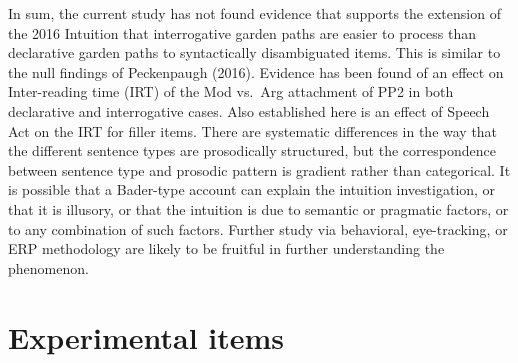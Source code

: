 \documentclass[12pt,oneside]{book}
\begin{document}
In sum, the current study has not found evidence that supports the extension of the 2016 Intuition that interrogative garden paths are easier to process than declarative garden paths to syntactically disambiguated items. This is similar to the null findings of Peckenpaugh (2016). Evidence has been found of an effect on Inter-reading time (IRT) of the Mod vs.~Arg attachment of PP2 in both declarative and interrogative cases. Also established here is an effect of Speech Act on the IRT for filler items. There are systematic differences in the way that the different sentence types are prosodically structured, but the correspondence between sentence type and prosodic pattern is gradient rather than categorical. It is possible that a Bader-type account can explain the intuition investigation, or that it is illusory, or that the intuition is due to semantic or pragmatic factors, or to any combination of such factors. Further study via behavioral, eye-tracking, or ERP methodology are likely to be fruitful in further understanding the phenomenon.

\singlespacing

\newpage

\hypertarget{appendix-appendices}{%
\appendix}


\hypertarget{appExp}{%
\chapter{Experimental items}\label{appExp}}
\end{document}
